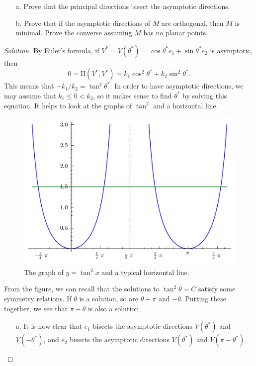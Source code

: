 \documentclass[Shifrin_Solutions_Spring_2018]{subfiles}
\begin{document}
\begin{exercise}
\begin{itemize}
\item[a.] Prove that the principal directions bisect the asymptotic directions.
\item[b.] Prove that if the asymptotic directions of $M$ are orthogonal, then  $M$ is minimal. Prove the converse assuming $M$ has no planar points.
\end{itemize}
\end{exercise}

\begin{proof}[Solution]
By Euler's formula, if $V^{\ast}= V(\theta^\ast) = \cos \theta^{\ast} e_1 + \sin \theta^{\ast} e_2$ is asymptotic, then
\[
0 = \mathrm{II}(V^\ast, V^\ast) = k_1\cos^2\theta^\ast + k_2 \sin^2\theta^\ast .
\]
This means that $-k_1/k_2 = \tan^2 \theta^\ast$. In order to have asymptotic directions, we may assume that $k_1 \leq 0 < k_2$, so it makes sense to find $\theta^\ast$ by solving this equation. It helps to look at the graphs of $\tan^2$ and a horizontal line.

\begin{figure}[h]
\centering
\includegraphics[width=.5\textwidth]{picturebook/ch2sec2/tan2-graph}
\caption{The graph of $y= \tan^2 x$ and a typical horizontal line.}
\end{figure}

From the figure, we can recall that the solutions to $\tan^2\theta = C$ satisfy some symmetry relations. If $\theta$ is a solution, so are $\theta+ \pi$ and $-\theta$. Putting these together, we see that $\pi - \theta$ is also a solution.

\begin{itemize}
\item[a.] It is now clear that $e_1$ bisects the asymptotic directions $V(\theta^\ast)$ and $V(-\theta^\ast)$, and $e_2$ bisects the asymptotic directions $V(\theta^\ast)$ and $V(\pi - \theta^\ast)$.


\end{itemize}
\end{proof}
\end{document}

